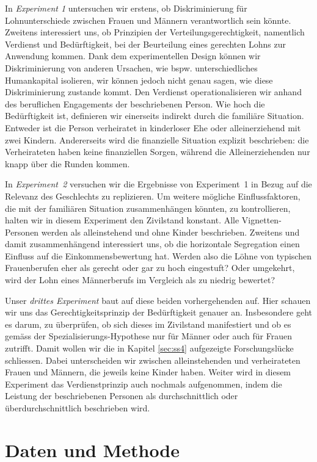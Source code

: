 \documentclass[a4paper,12pt]{article}
\begin{document}
In \emph{Experiment 1} untersuchen wir erstens, ob Diskriminierung für
Lohnunterschiede zwischen Frauen und Männern verantwortlich sein könnte.
Zweitens interessiert uns, ob Prinzipien der Verteilungsgerechtigkeit, namentlich Verdienst und Bedürftigkeit, bei der
Beurteilung eines gerechten Lohns zur Anwendung kommen. Dank dem
experimentellen Design können wir Diskriminierung von anderen Ursachen, wie
bspw. unterschiedliches Humankapital isolieren, wir können jedoch nicht genau
sagen, wie diese Diskriminierung zustande kommt. Den Verdienst operationalisieren wir anhand des beruflichen Engagements der beschriebenen Person. Wie hoch die Bedürftigkeit ist, definieren wir einerseits indirekt durch die familiäre Situation. Entweder ist die Person verheiratet in kinderloser Ehe oder alleinerziehend mit zwei Kindern. Andererseits wird die finanzielle Situation explizit beschrieben: die Verheirateten haben keine finanziellen Sorgen, während die Alleinerziehenden nur knapp über die Runden kommen.

In \emph{Experiment~2} versuchen wir die Ergebnisse von Experiment~1 in Bezug auf die
Relevanz des Geschlechts zu replizieren. Um weitere mögliche Einflussfaktoren,
die mit der familiären Situation zusammenhängen könnten, zu kontrollieren,
halten wir in diesem Experiment den Zivilstand konstant. Alle
Vignetten-Personen werden als alleinstehend und ohne Kinder beschrieben. Zweitens und damit zusammenhängend interessiert uns, ob die horizontale Segregation einen Einfluss auf
die Einkommensbewertung hat. Werden also die Löhne von typischen Frauenberufen eher als gerecht oder gar zu hoch eingestuft? Oder umgekehrt, wird der Lohn eines Männerberufs im Vergleich als zu niedrig bewertet?

Unser \emph{drittes Experiment} baut auf diese beiden vorhergehenden auf. Hier schauen wir uns das Gerechtigkeitsprinzip der Bedürftigkeit genauer an. Insbesondere geht es darum, zu überprüfen, ob sich dieses im Zivilstand manifestiert und ob es
gemäss der Spezialisierungs-Hypothese nur für Männer oder auch für Frauen zutrifft. Damit wollen wir die in Kapitel \ref{sec:ss4} aufgezeigte Forschungslücke schliessen. Dabei unterscheiden wir zwischen alleinstehenden und verheirateten Frauen und Männern, die jeweils keine Kinder haben. Weiter wird in diesem Experiment das Verdienstprinzip auch nochmals aufgenommen, indem die Leistung der beschriebenen Personen als durchschnittlich oder überdurchschnittlich beschrieben wird.

\section{Daten und Methode}
\label{sec:s3}
\end{document}
